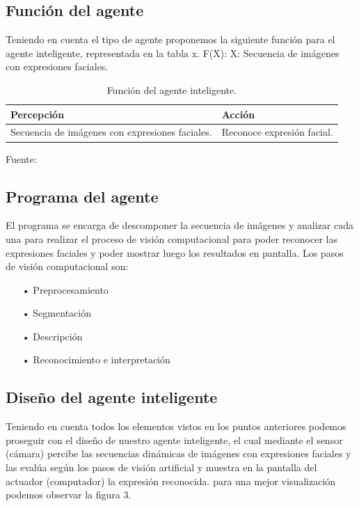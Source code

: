 \subsection{Función del agente}
Teniendo en cuenta el tipo de agente proponemos la siguiente función para el agente inteligente, representada en la tabla x.
\vskip 0.1cm
F(X): X: Secuencia de imágenes con expresiones faciales.

\begin{table}[ht!]
\centering
\caption{Función del agente inteligente.} \vskip 0.1cm
\begin{tabular}{|p{4cm} |p{3.5cm}|}  \hline 
\bf Percepción & \bf Acción \\ \hline 
Secuencia de imágenes con expresiones faciales. & Reconoce expresión facial. \\ \hline
\end{tabular} 
\begin{center}
{\small{Fuente: \cite{FALTA}}}
\end{center}
\end{table}

\subsection{Programa del agente}
El programa se encarga de descomponer la secuencia de imágenes y analizar cada una para realizar el proceso de visión computacional para poder reconocer las expresiones faciales y poder mostrar luego los resultados en pantalla. Los pasos de visión computacional son:

\begin{itemize}
\item[•] Preprocesamiento
\item[•] Segmentación
\item[•] Descripción
\item[•] Reconocimiento e interpretación
\end{itemize}

\subsection{Diseño del agente inteligente}
Teniendo en cuenta todos los elementos vistos en los puntos anteriores podemos proseguir con el diseño de nuestro agente inteligente, el cual mediante el sensor (cámara) percibe las secuencias dinámicas de imágenes con expresiones faciales y las evalúa según los pasos de visión artificial y muestra en la pantalla del actuador (computador) la expresión reconocida. para una mejor visualización podemos observar la figura 3.

